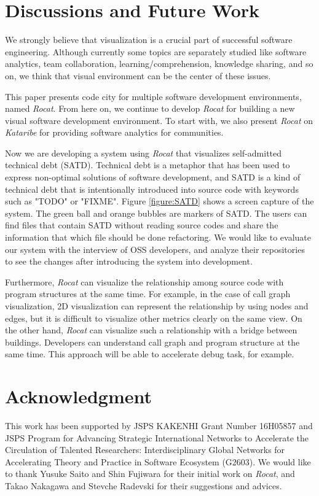 \documentclass[conference]{IEEEtran}
\newcommand{\figref}[1]{Figure \ref{#1}}
\begin{document}
\section{Discussions and Future Work}
We strongly believe that visualization is a crucial part of successful software engineering.
Although currently some topics are separately studied like software analytics, team collaboration, learning/comprehension, knowledge sharing, and so on, we think that visual environment can be the center of these issues.

This paper presents code city for multiple software development environments, named \textit{Rocat}.
From here on, we continue to develop \textit{Rocat} for building a new visual software development environment.
To start with, we also present \textit{Rocat} on \textit{Kataribe} for providing software analytics for communities.

Now we are developing a system using \textit{Rocat} that visualizes self-admitted technical debt (SATD).
Technical debt is a metaphor that has been used to express non-optimal solutions of software development, and SATD is a kind of technical debt that is intentionally introduced into source code with keywords such as "TODO" or "FIXME"\cite{6976075}.
\figref{figure:SATD} shows a screen capture of the system.
The green ball and orange bubbles are markers of SATD.
The users can find files that contain SATD without reading source codes and share the information that which file should be done refactoring.
We would like to evaluate our system with the interview of OSS developers, and analyze their repositories to see the changes after introducing the system into development.

Furthermore, \textit{Rocat} can visualize the relationship among source code with program structures at the same time.
For example, in the case of call graph visualization, 2D visualization can represent the relationship by using nodes and edges, but it is difficult to visualize other metrics clearly on the same view.
On the other hand, \textit{Rocat} can visualize such a relationship with a bridge between buildings.
Developers can understand call graph and program structure at the same time.
This approach will be able to accelerate debug task, for example.


\section*{Acknowledgment}
This work has been supported by JSPS KAKENHI Grant Number 16H05857 and JSPS Program for Advancing Strategic International Networks to Accelerate the Circulation of Talented Researchers: Interdisciplinary Global Networks for Accelerating Theory and Practice in Software Ecosystem (G2603).
We would like to thank Yusuke Saito and Shin Fujiwara for their initial work on \textit{Rocat}, and Takao Nakagawa and Stevche Radevski for their suggestions and advices.





\end{document}
